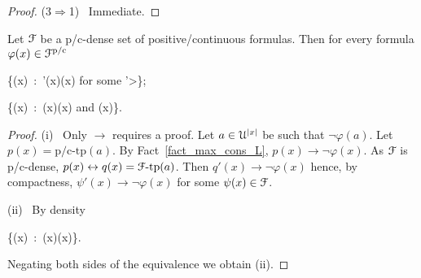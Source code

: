 \documentclass{amsproc}
\renewcommand*{\emph}[1]{%
   \smash{\tikz[baseline]\node[rectangle, fill=teal!25, rounded corners, inner xsep=0.5ex, inner ysep=0.2ex, anchor=base, minimum height = 2.7ex]{\strut #1};}}
\begin{document}
{\begin{proof}
  (3$\Rightarrow$1) \ 
  Immediate.
\end{proof}

\begin{proposition}\label{prop_Fapprox}
  Let ${\EuScript F}$ be a p/c-dense set of positive/continuous formulas.
  Then for every formula $\varphi(x)\in{\EuScript F}^{\rm p/c}$
  
  {\leftrightarrow}
  {\bigvee\big\{\psi(x)\ :\  \psi'(x)\rightarrow\neg\varphi(x)\textrm{ for some }\psi'>\psi\big\};}

  {\leftrightarrow}
  {\bigvee\big\{\neg\psi(x)\ :\ \neg\psi(x)\rightarrow\neg\varphi(x)\textrm{ and }\psi(x)\big\}.}

\end{proposition}
 
\begin{proof} 
  (i) \ Only $\rightarrow$ requires a proof.
  Let $a\in {\EuScript U}^{|x|}$ be such that $\neg\varphi(a)$.
  Let $p(x)=\mbox{p/c-tp}(a)$.
  By Fact~\ref{fact_max_cons_L}, $p(x)\rightarrow\neg\varphi(x)$.
  As ${\EuScript F}$ is p/c-dense, $p(x)\leftrightarrow q(x)={\EuScript F}\mbox{-tp}(a)$.
  Then $q'(x)\rightarrow\neg\varphi(x)$ hence, by compactness, $\psi'(x)\rightarrow\neg\varphi(x)$ for some $\psi(x)\in{\EuScript F}$.

  (ii) \ By density

  {\leftrightarrow}
  {\bigwedge\big\{\psi(x)\ :\ \varphi(x)\rightarrow\psi(x)\big\}.}
  
  Negating both sides of the equivalence we obtain (ii).
\end{proof}


\begin{comment}
\section{Elimination of quantifiers of sort \textsf{X} for positive formulas}\label{Ielimination}

We write \emph{${\EuScript F}^{\rm p/c}_{{\sf X}{\rm qf}}$} for the set of positive/continuous formulas without quantifiers of sort ${\sf X}$.

In this section we show that ${\EuScript F}^{\rm p}_{{\sf X}{\rm qf}}$ is p-dense modulo $T$ (the theory of ${\EuScript U}$).
In plain words, this amounts to the elimination of the quantifiers of sort ${\sf X}$ up to some approximation.
In Section~\ref{cIelimination} we prove the analogous result for ${\EuScript F}^{\rm c}_{{\sf X}{\rm qf}}$.


\end{comment}}
\end{document}
